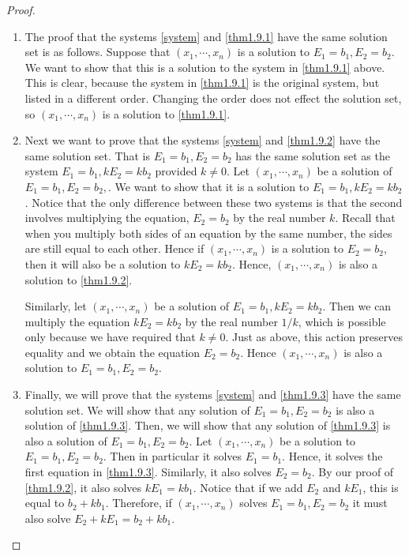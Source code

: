 \begin{proof} 
\begin{enumerate}
\item
The proof that the systems \ref{system} and \ref{thm1.9.1} have the
same solution set is as follows. Suppose that $\left( x_{1},\cdots
,x_{n}\right) $ is a solution to $E_{1}=b_{1},E_{2}=b_{2}$. We want to
show that this is a solution to the system in \ref{thm1.9.1} above.
This is clear, because the system in \ref{thm1.9.1} is the original
system, but listed in a different order. Changing the order does not
effect the solution set, so $\left( x_{1},\cdots ,x_{n}\right) $ is a
solution to \ref{thm1.9.1}.

\item
Next we want to prove that the systems \ref{system} and \ref{thm1.9.2} have the
same solution set. That is  $E_{1}=b_{1},E_{2}=b_{2}$ has
the same solution set as the system $E_{1}=b_{1},kE_{2}=kb_{2}$ provided $k\neq
0 $. Let $\left( x_{1},\cdots ,x_{n}\right) $ be a
solution of $E_{1}=b_{1},E_{2}=b_{2},$. We want to show that it is a solution to $E_{1}=b_{1},kE_{2}=kb_{2}$.
Notice that the only difference between these two systems is that the second involves
multiplying the equation, $E_{2}=b_{2}$ by the real number $k$. Recall that when you multiply both sides of an 
equation by the same number, the sides are still equal to each other. Hence if  $\left( x_{1},\cdots ,x_{n}\right) $
is a solution to $E_{2}=b_{2}$, then it will also be a solution to $kE_{2}=kb_{2}$. Hence, $\left( x_{1},\cdots ,x_{n}\right) $ is also
a solution to \ref{thm1.9.2}. 

Similarly, let $\left( x_{1},\cdots
,x_{n}\right) $ be a solution of $E_{1}=b_{1},kE_{2}=kb_{2}$. Then we can 
multiply the equation $kE_{2}=kb_{2}$ by the real number $1/k$, which is possible only because we have required that $k\neq
0$. Just as above, this action preserves equality and we obtain the equation $E_{2} = b_{2}$. 
Hence $\left( x_{1},\cdots ,x_{n}\right)$ is also a solution to  $E_{1}=b_{1},E_{2}=b_{2}.$ 

\item
Finally, we will prove that the systems \ref{system} and
\ref{thm1.9.3} have the same solution set. We will show that any
solution of $E_{1}=b_{1},E_{2}=b_{2}$ is also a solution of
\ref{thm1.9.3}. Then, we will show that any solution of \ref{thm1.9.3}
is also a solution of $E_{1}=b_{1},E_{2}=b_{2}$.  Let $\left(
x_{1},\cdots ,x_{n}\right) $ be a solution to
$E_{1}=b_{1},E_{2}=b_{2}$. Then in particular it solves $E_{1} =
b_{1}$. Hence, it solves the first equation in \ref{thm1.9.3}.
Similarly, it also solves $E_{2} = b_{2}$. By our proof of
\ref{thm1.9.2}, it also solves $kE_{1}=kb_{1}$.  Notice that if we add
$E_{2}$ and $kE_{1}$, this is equal to $b_{2} + kb_{1}$. Therefore, if
$\left( x_{1},\cdots ,x_{n}\right) $ solves $E_{1}=b_{1},E_{2}=b_{2}$
it must also solve $E_{2}+kE_{1}=b_{2}+kb_{1}$.


\end{enumerate}
\end{proof}
